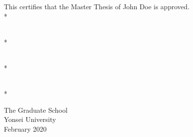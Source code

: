 %
%
%

\begin{signpage}
\begin{large}
\centering
This certifies that the Master Thesis of John Doe is approved.
\\*\vskip 80pt
\signature{Thesis Supervisor : Prof. John Doe}{}
\\*\vskip 50pt
\signature{Prof. John Doe}{}
\\*\vskip 50pt
\signature{Prof. John Doe}{}
\\*\vskip 200pt


The Graduate School\\
Yonsei University\\
February 2020

\end{large}
\end{signpage}


